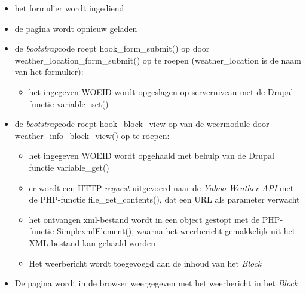 \begin{itemize}
	\item het formulier wordt ingediend
	\item de pagina wordt opnieuw geladen
	\item de \textit{bootstrap}code roept hook\_form\_submit() op door weather\_location\_form\_submit() op te roepen (weather\_location is de naam van het formulier):
	\begin{itemize}
		\item het ingegeven WOEID wordt opgeslagen op serverniveau met de Drupal functie variable\_set()
	\end{itemize}
	\item de \textit{bootstrap}code roept hook\_block\_view op van de weermodule door weather\_info\_block\_view() op te roepen:
	\begin{itemize}
		\item het ingegeven WOEID wordt opgehaald met behulp van de Drupal functie variable\_get()
		\item er wordt een HTTP-\textit{request} uitgevoerd naar de \textit{Yahoo Weather API} met de PHP-functie file\_get\_contents(), dat een URL als parameter verwacht
		\item het ontvangen xml-bestand wordt in een object gestopt met de PHP-functie SimplexmlElement(), waarna het weerbericht gemakkelijk uit het XML-bestand kan gehaald worden
		\item Het weerbericht wordt toegevoegd aan de inhoud van het \textit{Block}
	\end{itemize}
	\item De pagina wordt in de browser weergegeven met het weerbericht in het \textit{Block}
\end{itemize}

